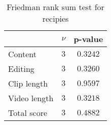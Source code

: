 \begin{table}[ht]
	\begin{center}
	\caption{Friedman rank sum test for recipies}
	\label{tab:fried_recip}
		\begin{tabular}{lcc}
		\toprule
			 & $\nu$ & p-value\\
			\midrule
			Content & $3$ & $0.3242$\\
			Editing & $3$ & $0.3260$\\
			Clip length & $3$ & $0.9597$\\
			Video length & $3$ & $0.3218$\\
			Total score & $3$ & $0.4882$\\
		\bottomrule
		\end{tabular}
	\end{center}
\end{table}